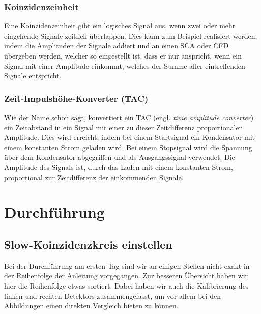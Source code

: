 \subsection{Koinzidenzeinheit}

Eine Koinzidenzeinheit gibt ein logisches Signal aus, wenn zwei oder mehr
eingehende Signale zeitlich überlappen. Dies kann zum Beispiel realisiert
werden, indem die Amplituden der Signale addiert und an einen SCA oder CFD
übergeben werden, welcher so eingestellt ist, dass er nur anspricht, wenn ein
Signal mit einer Amplitude einkommt, welches der Summe aller eintreffenden
Signale entspricht.

\subsection{Zeit-Impulshöhe-Konverter (TAC)}

Wie der Name schon sagt, konvertiert ein TAC (engl. \emph{time amplitude
converter}) ein Zeitabstand in ein Signal mit einer zu dieser Zeitdifferenz
proportionalen Amplitude. Dies wird erreicht, indem bei einem Startsignal ein
Kondensator mit einem konstanten Strom geladen wird. Bei einem Stopsignal wird
die Spannung über dem Kondensator abgegriffen und als Ausgangssignal
verwendet. Die Amplitude des Signals ist, durch das Laden mit einem konstanten
Strom, proportional zur Zeitdifferenz der einkommenden Signale.


\chapter{Durchführung}

\section{Slow-Koinzidenzkreis einstellen}

Bei der Durchführung am ersten Tag sind wir an einigen Stellen nicht exakt in
der Reihenfolge der Anleitung vorgegangen. Zur besseren Übersicht haben wir
hier die Reihenfolge etwas sortiert. Dabei haben wir auch die Kalibrierung des
linken und rechten Detektors zusammengefasst, um vor allem bei den Abbildungen
einen direkten Vergleich bieten zu können.

